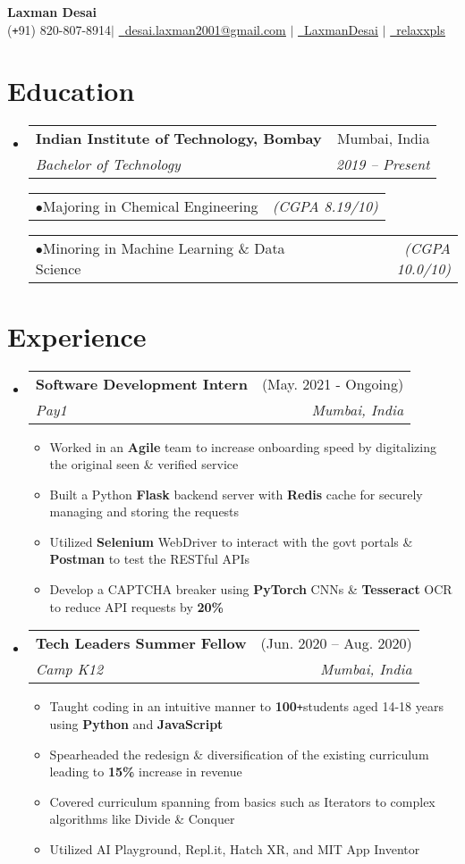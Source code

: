 \documentclass[a4paper,11pt]{article}
\makeatletter
\def\Plus{\texttt{+}}
\newcommand{\resumeItem}[1]{
  \item\small{
    {#1 \vspace{-2pt}}
  }
}
\newcommand{\resumeSubheading}[4]{
  \vspace{-2pt}\item
    \begin{tabular*}{\textwidth}[t]{l@{\extracolsep{\fill}}r}
      \textbf{#1} & #2 \\
      \textit{\small#3} & \textit{\small #4} \\
    \end{tabular*}\vspace{-7pt}
}
\newcommand{\resumeSubHeadingListStart}{\begin{itemize}[leftmargin=-0pt, label={}]}
\newcommand{\resumeSubHeadingListEnd}{\end{itemize}}
\newcommand{\resumeItemListStart}{\begin{itemize}}
\newcommand{\resumeItemListEnd}{\end{itemize}\vspace{-5pt}}
\newcommand{\resumeItemAlt}[2]{
    \begin{tabular*}{0.977\textwidth}{l@{\extracolsep{\fill}}r}
        \tiny{$\bullet$}\hspace{7pt}\small{#1} & \textit{\footnotesize #2} \\
    \end{tabular*}
}
\newcommand{\resumeItemAltListStart}{\begin{adjustwidth}{10.8pt}{}}
\newcommand{\resumeItemAltListEnd}{\end{adjustwidth}}
\makeatother
\begin{document}

\newcommand{\name}{Laxman Desai}
\newcommand{\email}{desai.laxman2001@gmail.com}
\newcommand{\contact}{(\Plus 91) 820-807-8914}
\newcommand{\GithubUsername}{relaxxpls}
\newcommand{\LinkedinUsername}{LaxmanDesai}

\begin{center}
	\textbf{\Huge \name}\\
	\vspace{10pt}
	\small \faMobile* \contact \quad$|$\quad
	\href{mailto:\email}{\faEnvelope\ \underline{\email}} \quad$|$\quad
	\href{https://linkedin.com/in/\LinkedinUsername}{\faLinkedin\ \underline{\LinkedinUsername}} \quad$|$\quad
	\href{https://github.com/\GithubUsername}{\faGithub\ \underline{\GithubUsername}}
\end{center}

\section{Education}
\resumeSubHeadingListStart
  \resumeSubheading
  {Indian Institute of Technology, Bombay}{Mumbai, India}
  {Bachelor of Technology}{2019 -- Present}
  \resumeItemAltListStart
    \resumeItemAlt{Majoring in Chemical Engineering}{(CGPA 8.19/10)}
    \resumeItemAlt{Minoring in Machine Learning \& Data Science}{(CGPA 10.0/10)}
  \resumeItemAltListEnd
\resumeSubHeadingListEnd


\section{Experience}
\resumeSubHeadingListStart
  \resumeSubheading
  {Software Development Intern}{(May. 2021 - Ongoing)}
  {Pay1}{Mumbai, India}
  \resumeItemListStart
    \resumeItem{Worked in an \textbf{Agile} team to increase onboarding speed by digitalizing the original seen \& verified service}
    \resumeItem{Built a Python \textbf{Flask} backend server with \textbf{Redis} cache for securely managing and storing the requests}
    \resumeItem{Utilized \textbf{Selenium} WebDriver to interact with the govt portals \& \textbf{Postman} to test the RESTful APIs} 
    \resumeItem{Develop a CAPTCHA breaker using \textbf{PyTorch} CNNs \& \textbf{Tesseract} OCR to reduce API requests by \textbf{20\%}}
  \resumeItemListEnd

  \resumeSubheading
  {Tech Leaders Summer Fellow}{(Jun. 2020 -- Aug. 2020)}
  {Camp K12}{Mumbai, India}
  \resumeItemListStart
    \resumeItem{Taught coding in an intuitive manner to \textbf{100}\Plus students aged 14\hspace{2pt}-\hspace{1pt}18 years using \textbf{Python} and \textbf{JavaScript}}
    \resumeItem{Spearheaded the redesign \& diversification of the existing curriculum leading to \textbf{15\%} increase in revenue}
    \resumeItem{Covered curriculum spanning from basics such as Iterators to complex algorithms like Divide \& Conquer}
    \resumeItem{Utilized AI Playground, Repl.it, Hatch XR, and MIT App Inventor}
    \resumeItemListEnd
  \resumeSubHeadingListEnd
\end{document}

